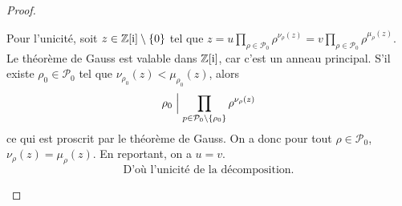 \documentclass[12pt]{article}
\begin{document}
\begin{proof}
\begin{enumerate}
		Pour l'unicité, soit $z\in\mathbb{Z}[\mathrm{i}]\setminus\left\{0\right\}$ tel que $z=u\prod_{\rho\in\mathcal{P}_{0}}\rho^{\nu_{\rho}(z)}=v\prod_{\rho\in\mathcal{P}_{0}}\rho^{\mu_{\rho}(z)}$. Le théorème de Gauss est valable dans $\mathbb{Z}[\mathrm{i}]$, car c'est un anneau principal. S'il existe $\rho_{0}\in\mathcal{P}_{0}$ tel que $\nu_{\rho_{0}}(z)<\mu_{\rho_{0}}(z)$, alors 
		\begin{equation}
			\rho_{0}\Bigm|\prod_{p\in\mathcal{P}_{0}\setminus\{\rho_{0}\}}\rho^{\nu_{\rho}(z)}
		\end{equation}
		ce qui est proscrit par le théorème de Gauss. On a donc pour tout $\rho\in\mathcal{P}_{0}$, $\nu_{\rho}(z)=\mu_{\rho}(z)$. En reportant, on a $u=v$.
		\begin{equation}
			\boxed{\text{D'où l'unicité de la décomposition.}}
		\end{equation}
	\end{enumerate}
\end{proof}
\end{document}
